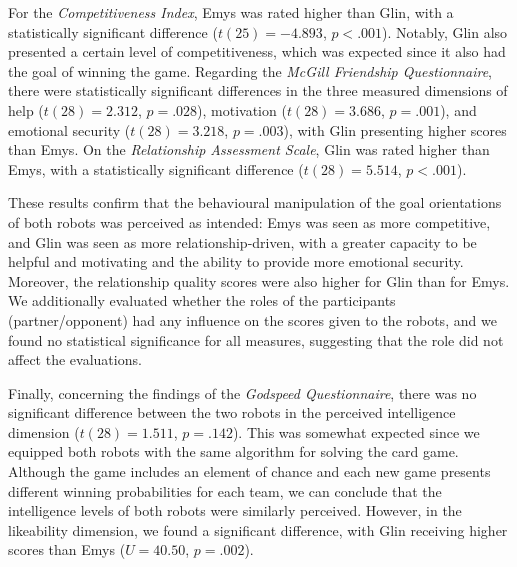 For the \textit{Competitiveness Index}, Emys was rated higher than Glin, with a statistically significant difference ($t(25) = -4.893$, $p<.001$).
Notably, Glin also presented a certain level of competitiveness, which was expected since it also had the goal of winning the game.
Regarding the \textit{McGill Friendship Questionnaire}, there were statistically significant differences in the three measured dimensions of help ($t(28)=2.312$, $p=.028$), motivation ($t(28)=3.686$, $p=.001$), and emotional security ($t(28)=3.218$, $p=.003$), with Glin presenting higher scores than Emys.
On the \textit{Relationship Assessment Scale}, Glin was rated higher than Emys, with a statistically significant difference ($t(28)=5.514$, $p<.001$).

These results confirm that the behavioural manipulation of the goal orientations of both robots was perceived as intended: Emys was seen as more competitive, and Glin was seen as more relationship-driven, with a greater capacity to be helpful and motivating and the ability to provide more emotional security. Moreover, the relationship quality scores were also higher for Glin than for Emys. We additionally evaluated whether the roles of the participants (partner/opponent) had any influence on the scores given to the robots, and we found no statistical significance for all measures, suggesting that the role did not affect the evaluations.

Finally, concerning the findings of the \textit{Godspeed Questionnaire}, there was no significant difference between the two robots in the perceived intelligence dimension ($t(28)=1.511$, $p=.142$). This was somewhat expected since we equipped both robots with the same algorithm for solving the card game. Although the game includes an element of chance and each new game presents different winning probabilities for each team, we can conclude that the intelligence levels of both robots were similarly perceived. However, in the likeability dimension, we found a significant difference, with Glin receiving higher scores than Emys ($U=40.50$, $p=.002$).

